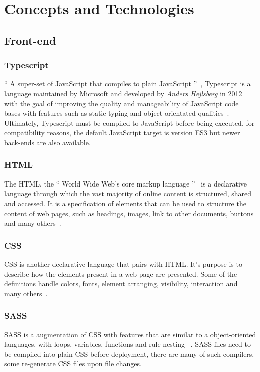 \chapter{Concepts and Technologies}
\label{cha:concepts}

\section{Front-end}
\label{cha:concepts:sec:frontend}

\subsection{Typescript}
`` A super-set of JavaScript that compiles to plain JavaScript ''~\cite{tswebsite}, Typescript is a language maintained by Microsoft and developed by \textit{Anders Hejlsberg} in 2012 with the goal of improving the quality and manageability of JavaScript code bases with features such as static typing and object-orientated qualities~\cite{tsrevealed}. Ultimately, Typescript must be compiled to JavaScript before being executed, for compatibility reasons, the default JavaScript target is version ES3 but newer back-ends are also available.

\subsection{HTML}
The \gls{HTML}, the `` World Wide Web's core markup language ''~\cite{html} is a declarative language through which the vast majority of online content is structured, shared and accessed. It is a specification of elements that can be used to structure the content of web pages, such as headings, images, link to other documents, buttons and many others~\cite{htmlcss}.

\subsection{CSS}
\gls{CSS} is another declarative language that pairs with HTML. It's purpose is to describe how the elements present in a web page are presented.
Some of the definitions handle colors, fonts, element arranging, visibility, interaction and many others~\cite{htmlcss}.

\subsection{SASS}
\gls{SASS} is a augmentation of CSS with features that are similar to a object-oriented languages, with loops, variables, functions and rule nesting ~\cite{sass}. SASS files need to be compiled into plain CSS before deployment, there are many of such compilers, some re-generate CSS files upon file  changes.

